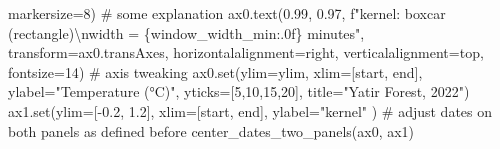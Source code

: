 \documentclass[
  letterpaper,
  DIV=11,
  numbers=noendperiod,
  oneside]{scrreprt}
\newenvironment{Shaded}{\begin{snugshade}}{\end{snugshade}}
\newcommand{\BuiltInTok}[1]{\textcolor[rgb]{0.00,0.23,0.31}{#1}}
\newcommand{\CharTok}[1]{\textcolor[rgb]{0.13,0.47,0.30}{#1}}
\newcommand{\CommentTok}[1]{\textcolor[rgb]{0.37,0.37,0.37}{#1}}
\newcommand{\DecValTok}[1]{\textcolor[rgb]{0.68,0.00,0.00}{#1}}
\newcommand{\FloatTok}[1]{\textcolor[rgb]{0.68,0.00,0.00}{#1}}
\newcommand{\NormalTok}[1]{\textcolor[rgb]{0.00,0.23,0.31}{#1}}
\newcommand{\OperatorTok}[1]{\textcolor[rgb]{0.37,0.37,0.37}{#1}}
\newcommand{\SpecialCharTok}[1]{\textcolor[rgb]{0.37,0.37,0.37}{#1}}
\newcommand{\SpecialStringTok}[1]{\textcolor[rgb]{0.13,0.47,0.30}{#1}}
\newcommand{\StringTok}[1]{\textcolor[rgb]{0.13,0.47,0.30}{#1}}
\begin{document}
\begin{Shaded}
\begin{Highlighting}[]
\NormalTok{         markersize}\OperatorTok{=}\DecValTok{8}\NormalTok{)}
\CommentTok{\# some explanation}
\NormalTok{ax0.text(}\FloatTok{0.99}\NormalTok{, }\FloatTok{0.97}\NormalTok{, }\SpecialStringTok{f"kernel: boxcar (rectangle)}\CharTok{\textbackslash{}n}\SpecialStringTok{width = }\SpecialCharTok{\{}\NormalTok{window\_width\_min}\SpecialCharTok{:.0f\}}\SpecialStringTok{ minutes"}\NormalTok{, transform}\OperatorTok{=}\NormalTok{ax0.transAxes,}
\NormalTok{         horizontalalignment}\OperatorTok{=}\StringTok{\textquotesingle{}right\textquotesingle{}}\NormalTok{, verticalalignment}\OperatorTok{=}\StringTok{\textquotesingle{}top\textquotesingle{}}\NormalTok{,}
\NormalTok{         fontsize}\OperatorTok{=}\DecValTok{14}\NormalTok{)}
\CommentTok{\# axis tweaking}
\NormalTok{ax0.}\BuiltInTok{set}\NormalTok{(ylim}\OperatorTok{=}\NormalTok{ylim,}
\NormalTok{        xlim}\OperatorTok{=}\NormalTok{[start, end],}
\NormalTok{        ylabel}\OperatorTok{=}\StringTok{"Temperature (°C)"}\NormalTok{,}
\NormalTok{        yticks}\OperatorTok{=}\NormalTok{[}\DecValTok{5}\NormalTok{,}\DecValTok{10}\NormalTok{,}\DecValTok{15}\NormalTok{,}\DecValTok{20}\NormalTok{],}
\NormalTok{        title}\OperatorTok{=}\StringTok{"Yatir Forest, 2022"}\NormalTok{)}
\NormalTok{ax1.}\BuiltInTok{set}\NormalTok{(ylim}\OperatorTok{=}\NormalTok{[}\OperatorTok{{-}}\FloatTok{0.2}\NormalTok{, }\FloatTok{1.2}\NormalTok{],}
\NormalTok{        xlim}\OperatorTok{=}\NormalTok{[start, end],}
\NormalTok{        ylabel}\OperatorTok{=}\StringTok{"kernel"}
\NormalTok{       )}
\CommentTok{\# adjust dates on both panels as defined before}
\NormalTok{center\_dates\_two\_panels(ax0, ax1)}


\end{Highlighting}
\end{Shaded}
\end{document}

